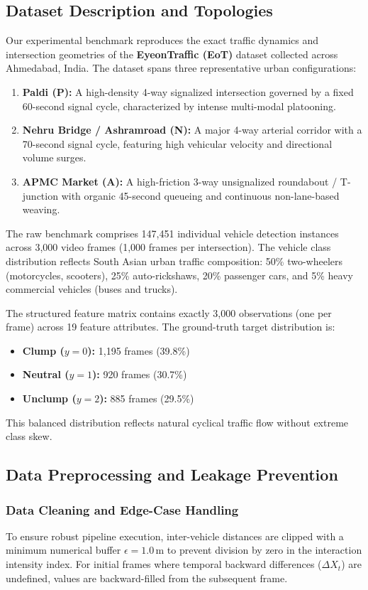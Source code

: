\documentclass[conference]{IEEEtran}
\begin{document}
\subsection{Dataset Description and Topologies}
Our experimental benchmark reproduces the exact traffic dynamics and intersection geometries of the \textbf{EyeonTraffic (EoT)} dataset \cite{kumar2024tsanet, eot_repo} collected across Ahmedabad, India. The dataset spans three representative urban configurations:
\begin{enumerate}
    \item \textbf{Paldi (P):} A high-density 4-way signalized intersection governed by a fixed 60-second signal cycle, characterized by intense multi-modal platooning.
    \item \textbf{Nehru Bridge / Ashramroad (N):} A major 4-way arterial corridor with a 70-second signal cycle, featuring high vehicular velocity and directional volume surges.
    \item \textbf{APMC Market (A):} A high-friction 3-way unsignalized roundabout / T-junction with organic 45-second queueing and continuous non-lane-based weaving.
\end{enumerate}

The raw benchmark comprises 147,451 individual vehicle detection instances across 3,000 video frames (1,000 frames per intersection). The vehicle class distribution reflects South Asian urban traffic composition: 50\% two-wheelers (motorcycles, scooters), 25\% auto-rickshaws, 20\% passenger cars, and 5\% heavy commercial vehicles (buses and trucks).

The structured feature matrix contains exactly 3,000 observations (one per frame) across 19 feature attributes. The ground-truth target distribution is:
\begin{itemize}
    \item \textbf{Clump ($y=0$):} 1,195 frames (39.8\%)
    \item \textbf{Neutral ($y=1$):} 920 frames (30.7\%)
    \item \textbf{Unclump ($y=2$):} 885 frames (29.5\%)
\end{itemize}
This balanced distribution reflects natural cyclical traffic flow without extreme class skew.

\subsection{Data Preprocessing and Leakage Prevention}
\subsubsection{Data Cleaning and Edge-Case Handling}
To ensure robust pipeline execution, inter-vehicle distances are clipped with a minimum numerical buffer $\epsilon = 1.0\,\text{m}$ to prevent division by zero in the interaction intensity index. For initial frames where temporal backward differences ($\Delta X_t$) are undefined, values are backward-filled from the subsequent frame.
\end{document}
